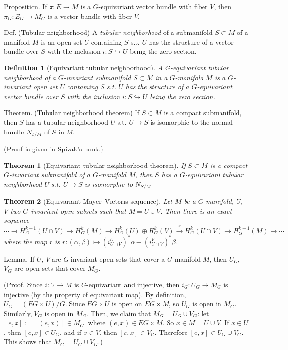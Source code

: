 \documentclass{article}
\theoremstyle{mystyle}
\newtheorem*{definition}{Definition}%
\newtheorem*{theorem*}{Theorem}
\theoremstyle{remark}
\numberwithin{equation}{section}
\begin{document}
Proposition. If $\pi\colon E\rightarrow M$ is a $G$-equivariant vector bundle with fiber $V$, then $\pi_G\colon E_G\rightarrow M_G$ is a vector bundle with fiber $V$.


Def. (Tubular neighborhood)
A \emph{tubular neighborhood} of a submanifold $S\subset M$ of a manifold $M$ is an open set $U$ containing $S$ s.t. $U$ has the structure of a vector bundle over $S$ with the inclusion $i\colon S\hookrightarrow U$ being the zero section.


\begin{definition}[Equivariant tubular neighborhood]
A \emph{$G$-equivariant tubular neighborhood} of a $G$-invariant submanifold $S\subset M$ in a $G$-manifold $M$ is a $G$-invariant open set $U$ containing $S$ s.t. $U$ has the structure of a $G$-equivariant vector bundle over $S$ with the inclusion $i\colon S\hookrightarrow U$ being the zero section.
\end{definition}


Theorem. (Tubular neighborhood theorem)
If $S\subset M$ is a compact submanifold, then $S$ has a tubular neighborhood $U$ s.t. $U\rightarrow S$ is isomorphic to the normal bundle $N_{S/M}$ of $S$ in $M$.

(Proof is given in Spivak's book.)


\begin{theorem*}[Equivariant tubular neighborhood theorem]
If $S\subset M$ is a compact $G$-invariant submanifold of a $G$-manifold $M$, then $S$ has a $G$-equivariant tubular neighborhood $U$ s.t. $U\rightarrow S$ is isomorphic to $N_{S/M}$. 
\end{theorem*}

\begin{theorem*}[Equivariant Mayer--Vietoris sequence]
Let $M$ be a $G$-manifold, $U$, $V$ two $G$-invariant open subsets such that $M= U\cup V$. Then there is an exact sequence
\begin{equation}\label{MVeqv}
\cdots \rightarrow H^{k-1}_G(U\cap V)\rightarrow H^k_G(M)
\rightarrow 
H^k_G(U)\oplus H^k_G(V)
\xrightarrow{r}
H^k_G(U\cap V) \rightarrow H^{k+1}_G(M)\rightarrow \cdots 
\end{equation}
where the map $r$ is $r\colon (\alpha,\beta) \mapsto (i^U_{U\cap V})^*\alpha - (i^V_{U\cap V})^*\beta$.
\end{theorem*}

Lemma. If $U$, $V$ are $G$-invariant open sets that cover a $G$-manifold $M$, then $U_G$, $V_G$ are open sets that cover $M_G$. 

(Proof. Since $i\colon U\rightarrow M$ is $G$-equivariant and injective, then $i_G\colon U_G\rightarrow M_G$ is injective (by the property of equivariant map). By definition, $U_G = (EG\times U)/G$. Since $EG\times U$ is open on $EG\times M$, so $U_G$ is open in $M_G$. Similarly, $V_G$ is open in $M_G$. Then, we claim that $M_G = U_G\cup V_G$: let $[e,x]:=[(e,x)]\in M_G$, where $(e,x) \in EG\times M$. So $x\in M = U\cup V$. If $x\in U$, then $[e,x]\in U_G$, and if $x\in V$, then $[e,x] \in V_G$. Therefore $[e,x] \in U_G\cup V_G$. This shows that $M_G = U_G\cup V_G$.)
\end{document}
